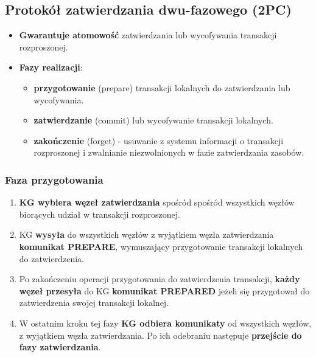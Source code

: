 \documentclass[a4paper]{article}
\begin{document}
    \subsection{Protokół zatwierdzania dwu-fazowego (2PC)}
    \begin{itemize}
        \item \textbf{Gwarantuje atomowość} zatwierdzania lub wycofywania transakcji rozproszonej.
        \item \textbf{Fazy realizacji}:
        \begin{itemize}
            \item \textbf{przygotowanie} (prepare) transakcji lokalnych do zatwierdzania lub wycofywania.
            \item \textbf{zatwierdzanie} (commit) lub wycofywanie transakcji lokalnych.
            \item \textbf{zakończenie} (forget) - usuwanie z systemu informacji o transakcji rozproszonej i
            zwalnianie niezwolnionych w fazie zatwierdzania zasobów.
        \end{itemize}
    \end{itemize}


    \subsubsection{Faza przygotowania}
    \begin{enumerate}
        \item \textbf{KG wybiera węzeł zatwierdzania} spośród spośród
        wszystkich węzłów biorących udział w transakcji rozproszonej.
        \item KG \textbf{wysyła} do wszystkich węzłów z wyjątkiem węzła zatwierdzania
        \textbf{komunikat PREPARE}, wymuszający przygotowanie transakcji lokalnych do zatwierdzenia.
        \item Po zakończeniu operacji przygotowania do zatwierdzenia transakcji, \textbf{każdy
        węzeł przesyła} do KG \textbf{komunikat PREPARED} jeżeli się
        przygotował do zatwierdzenia swojej transakcji lokalnej.
        \item W ostatnim kroku tej fazy \textbf{KG odbiera komunikaty} od
        wszystkich węzłów, z wyjątkiem węzła zatwierdzania. Po ich odebraniu
        następuje \textbf{przejście do fazy zatwierdzania}.
    \end{enumerate}
\end{document}

